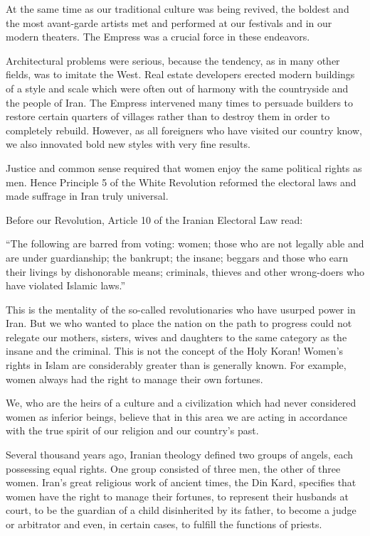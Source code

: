 At the same time as our traditional culture was being revived, the boldest and the most avant-garde artists met and performed at our festivals and in our modern theaters. The Empress was a crucial force in these endeavors. 

Architectural problems were serious, because the tendency, as in many other fields, was to imitate the West. Real estate developers erected modern buildings of a style and scale which were often out of harmony with the countryside and the people of Iran. The Empress intervened many times to persuade builders to restore certain quarters of villages rather than to destroy them in order to completely rebuild. However, as all foreigners who have visited our country know, we also innovated bold new styles with very fine results. 


Justice and common sense required that women enjoy the same political rights as men. Hence Principle 5 of the White Revolution reformed the electoral laws and made suffrage in Iran truly universal. 

Before our Revolution, Article 10 of the Iranian Electoral Law read: 

“The following are barred from voting: women; those who are not legally able and are under guardianship; the bankrupt; the insane; beggars and those who earn their livings by dishonorable means; criminals, thieves and other wrong-doers who have violated Islamic laws.” 

This is the mentality of the so-called revolutionaries who have usurped power in Iran. But we who wanted to place the nation on the path to progress could not relegate our mothers, sisters, wives and daughters to the same category as the insane and the criminal. This is not the concept of the Holy Koran! Women’s rights in Islam are considerably greater than is generally known. For example, women always had the right to manage their own fortunes. 

We, who are the heirs of a culture and a civilization which had never considered women as inferior beings, believe that in this area we are acting in accordance with the true spirit of our religion and our country’s past. 

Several thousand years ago, Iranian theology defined two groups of angels, each possessing equal rights. One group consisted of three men, the other of three women. Iran's great religious work of ancient times, the Din Kard, specifies that women have the right to manage their fortunes, to represent their husbands at court, to be the guardian of a child disinherited by its father, to become a judge or arbitrator and even, in certain cases, to fulfill the functions of priests. 

